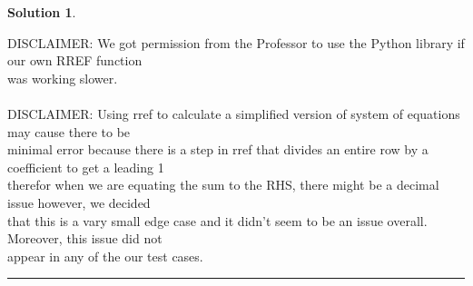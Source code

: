\documentclass{article}
\theoremstyle{definition}
\def\fline{\rule{0.75\linewidth}{0.5pt}}
\newcommand{\finishline}{\vspace{-15pt}\begin{center}\fline\end{center}}
\newtheorem*{solution*}{Solution}
\newenvironment{solution}{\begin{solution*}}{{\finishline} \end{solution*}}
\begin{document}
\begin{solution}
\begin{tabbing}
    \> DISCLAIMER: We got permission from the Professor to use the Python library if our own RREF function\\ \>was working slower.\\\\
    \> DISCLAIMER: Using rref to calculate a simplified version of system of equations may cause there to be\\ \>minimal error because there is a step in rref that divides an entire row by a coefficient to get a leading 1\\ \>therefor when we are equating the sum to the RHS, there might be a decimal issue however, we decided\\ \>that this is a vary small edge case and it didn't seem to be an issue overall. Moreover, this issue did not\\ \>appear in any of the our test cases.
	\end{tabbing}
\end{solution}
\smallskip
\end{document}
